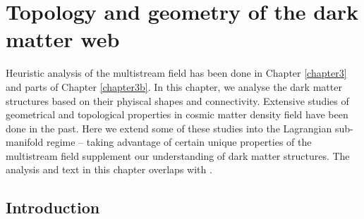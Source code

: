 \chapter{Topology and geometry of the dark matter web}\label{chapter4}

Heuristic analysis of the multistream field has been done in Chapter \ref{chapter3} and parts of Chapter \ref{chapter3b}. In this chapter, we analyse the dark matter structures based on their phyiscal shapes and connectivity. Extensive studies of geometrical and topological properties in cosmic matter density field have been done in the past. Here we extend some of these studies into the Lagrangian sub-manifold regime -- taking advantage of certain unique properties of the multistream field supplement our understanding of dark matter structures. The analysis and text in this chapter overlaps with \cite{Ramachandra2017}.   


\section{Introduction} 
\label{sec:intro}


